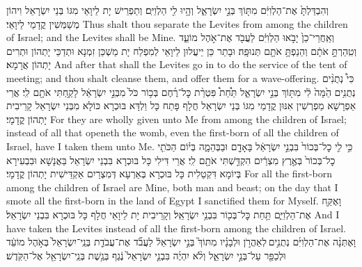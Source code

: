 {וְהִבְדַּלְתָּ֙ אֶת־הַלְוִיִּ֔ם מִתּ֖וֹךְ בְּנֵ֣י יִשְׂרָאֵ֑ל וְהָ֥יוּ לִ֖י הַלְוִיִּֽם׃}
{וְתַפְרֵישׁ יָת לֵיוָאֵי מִגּוֹ בְּנֵי יִשְׂרָאֵל וִיהוֹן מְשַׁמְּשִׁין קֳדָמַי לֵיוָאֵי׃}
{Thus shalt thou separate the Levites from among the children of Israel; and the Levites shall be Mine.}{}
{וְאַֽחֲרֵי־כֵן֙ יָבֹ֣אוּ הַלְוִיִּ֔ם לַעֲבֹ֖ד אֶת־אֹ֣הֶל מוֹעֵ֑ד וְטִֽהַרְתָּ֣ אֹתָ֔ם וְהֵנַפְתָּ֥ אֹתָ֖ם תְּנוּפָֽה׃}
{וּבָתַר כֵּן יֵיעֲלוּן לֵיוָאֵי לְמִפְלַח יָת מַשְׁכַּן זִמְנָא וּתְדַכֵּי יָתְהוֹן וּתְרִים יָתְהוֹן אֲרָמָא׃}
{And after that shall the Levites go in to do the service of the tent of meeting; and thou shalt cleanse them, and offer them for a wave-offering.}{}
{כִּי֩ נְתֻנִ֨ים נְתֻנִ֥ים הֵ֙מָּה֙ לִ֔י מִתּ֖וֹךְ בְּנֵ֣י יִשְׂרָאֵ֑ל תַּ֩חַת֩ פִּטְרַ֨ת כׇּל־רֶ֜חֶם בְּכ֥וֹר כֹּל֙ מִבְּנֵ֣י יִשְׂרָאֵ֔ל לָקַ֥חְתִּי אֹתָ֖ם לִֽי׃
}
{אֲרֵי אַפְרָשָׁא מַפְרְשִׁין אִנּוּן קֳדָמַי מִגּוֹ בְּנֵי יִשְׂרָאֵל חֲלָף פָּתַח כָּל וַלְדָּא בּוּכְרָא כּוֹלָא מִבְּנֵי יִשְׂרָאֵל קָרֵיבִית יָתְהוֹן קֳדָמָי׃}
{For they are wholly given unto Me from among the children of Israel; instead of all that openeth the womb, even the first-born of all the children of Israel, have I taken them unto Me.}{}
{כִּ֣י לִ֤י כׇל־בְּכוֹר֙ בִּבְנֵ֣י יִשְׂרָאֵ֔ל בָּאָדָ֖ם וּבַבְּהֵמָ֑ה בְּי֗וֹם הַכֹּתִ֤י כׇל־בְּכוֹר֙ בְּאֶ֣רֶץ מִצְרַ֔יִם הִקְדַּ֥שְׁתִּי אֹתָ֖ם לִֽי׃
}
{אֲרֵי דִּילִי כָּל בּוּכְרָא בִּבְנֵי יִשְׂרָאֵל בַּאֲנָשָׁא וּבִבְעִירָא בְּיוֹמָא דִּקְטַלִית כָּל בּוּכְרָא בְּאַרְעָא דְּמִצְרַיִם אַקְדֵּישִׁית יָתְהוֹן קֳדָמָי׃}
{For all the first-born among the children of Israel are Mine, both man and beast; on the day that I smote all the first-born in the land of Egypt I sanctified them for Myself.}{}
{וָאֶקַּ֖ח אֶת־הַלְוִיִּ֑ם תַּ֥חַת כׇּל־בְּכ֖וֹר בִּבְנֵ֥י יִשְׂרָאֵֽל׃}
{וְקָרֵיבִית יָת לֵיוָאֵי חֲלָף כָּל בּוּכְרָא בִּבְנֵי יִשְׂרָאֵל׃}
{And I have taken the Levites instead of all the first-born among the children of Israel.}{}
{וָאֶתְּנָ֨ה אֶת־הַלְוִיִּ֜ם נְתֻנִ֣ים \legarmeh  לְאַהֲרֹ֣ן וּלְבָנָ֗יו מִתּוֹךְ֮ בְּנֵ֣י יִשְׂרָאֵל֒ לַעֲבֹ֞ד אֶת־עֲבֹדַ֤ת בְּנֵֽי־יִשְׂרָאֵל֙ בְּאֹ֣הֶל מוֹעֵ֔ד וּלְכַפֵּ֖ר עַל־בְּנֵ֣י יִשְׂרָאֵ֑ל וְלֹ֨א יִהְיֶ֜ה בִּבְנֵ֤י יִשְׂרָאֵל֙ נֶ֔גֶף בְּגֶ֥שֶׁת בְּנֵֽי־יִשְׂרָאֵ֖ל אֶל־הַקֹּֽדֶשׁ׃
}
